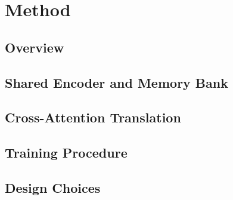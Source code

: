 \section{Method}
\label{sec:method}



\subsection{Overview}

\subsection{Shared Encoder and Memory Bank}
\label{sec:memory_bank}

\subsection{Cross-Attention Translation}
\label{sec:cross_attention}

\subsection{Training Procedure}
\label{sec:training}

\subsection{Design Choices}
\label{sec:design_choices}
